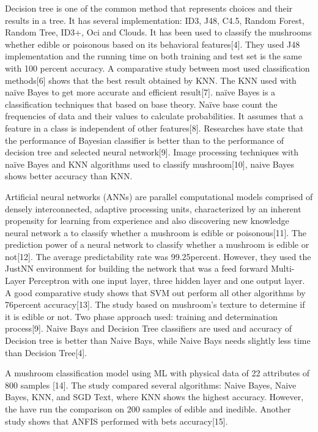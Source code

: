\documentclass[a4paper,11pt]{article}
\begin{document}
            Decision tree is one of the common method that represents choices and their results in a tree.  It has several implementation: ID3, J48, C4.5, Random Forest, Random Tree, ID3+, Oci and Clouds. It has been used to classify the mushrooms whether edible or poisonous based on its behavioral features[4]. They used J48 implementation and the running time on both training and test set is the same with
            100 percent accuracy. A comparative study between most used classification methods[6] shows that the best result obtained by KNN.  The KNN used with naïve Bayes to get more accurate and efficient result[7]. naïve Bayes is a classification techniques that based on base theory. Naïve  base count the frequencies  of data and their values  to calculate probabilities. It  assumes that a feature  in a  class is independent of other features[8]. Researches have state that the performance of Bayesian classifier is better than to the performance of decision tree and selected neural network[9].  Image processing techniques with naïve Bayes and KNN algorithms used to classify mushroom[10],  naive Bayes shows better accuracy than KNN.  
            
            Artificial neural networks (ANNs) are parallel computational models comprised of densely interconnected, adaptive processing units, characterized by an inherent propensity for learning from experience and also discovering new knowledge neural network a to classify whether a mushroom is edible or poisonous[11]. The prediction power of a neural network to classify whether a mushroom is edible or not[12]. The average predictability rate was 99.25percent. However, they used the JustNN environment for building the network that was a feed forward Multi-Layer Perceptron with one input layer, three hidden layer and one output layer. A good comparative study shows that SVM out perform all other algorithms by 76percent accuracy[13]. The study based on mushroom’s texture to determine if it is edible or not. Two phase approach used: training and determination process[9]. Naive Bays and Decision Tree classifiers are used and accuracy of Decision tree is better than Naive Bays, while Naive Bays needs slightly less time than Decision Tree[4].  
            
            A mushroom classification model using ML with physical data of 22 attributes of 800 samples [14]. The study compared several algorithms: Naive Bayes, Naive Bayes, KNN, and SGD Text, where KNN shows the highest accuracy. However, the have run the comparison on 200 samples of edible and inedible.  Another study shows that ANFIS performed with bets accuracy[15].  
            
\end{document}
